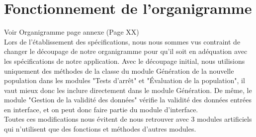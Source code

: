 \documentclass[a4paper,11pt]{article}
\begin{document}
	\section{Fonctionnement de l'organigramme}
		Voir Organigramme page annexe (Page XX)\\

		Lors de l'établissement des spécifications, nous nous sommes vus contraint de changer le découpage de notre organigramme pour qu’il soit en adéquation avec les spécifications de notre application. 
		Avec le découpage initial, nous utilisions uniquement des méthodes de la classe du module Génération de la nouvelle population dans les modules "Tests d’arrêt" et "Évaluation de la population", il vaut mieux donc les inclure directement dans le module Génération.
		De même, le module "Gestion de la validité des données" vérifie la validité des données entrées en interface, et on peut donc faire partie du module d'interface.\\
		Toutes ces modifications nous évitent de nous retrouver avec 3 modules artificiels qui n'utilisent que des fonctions et méthodes d'autres modules.

		
		
\end{document}
